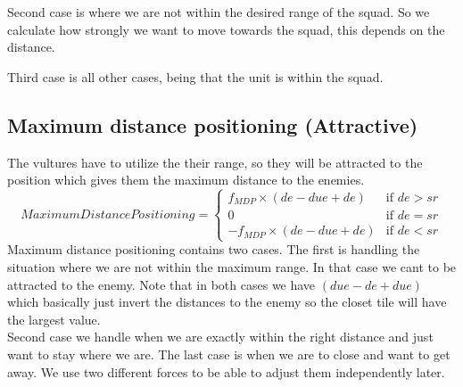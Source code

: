		Second case  is where we are not within the desired range of the squad. So we calculate how strongly we want to move towards the squad, this depends on the distance. 
		
		Third case is all other cases, being that the unit is within the squad.
					
	\subsection*{Maximum distance positioning (Attractive)}
		The vultures have to utilize the their range, so they will be attracted to the position which gives them the maximum distance 
		to the enemies.
		\begin{displaymath}
			MaximumDistancePositioning = \begin{cases}
					f_{MDP} \times (de - due + de) & \text{if } de > sr\\
					0 & \text{if } de = sr\\
					-f_{MDP} \times (de - due + de) & \text{if } de < sr
				\end{cases}		
		\end{displaymath}
		Maximum distance positioning contains two cases. The first is handling the situation where we are not within the maximum range. In that case we cant to be attracted to the enemy. Note that in both cases we have $(due - de + due)$ which basically just invert the distances to the enemy so the closet tile will have the largest value.\\
		Second case we handle when we are exactly within the right distance and just want to stay where we are.
		The last case is when we are to close and want to get away.
		We use two different forces to be able to adjust them independently later.
		
		
		
